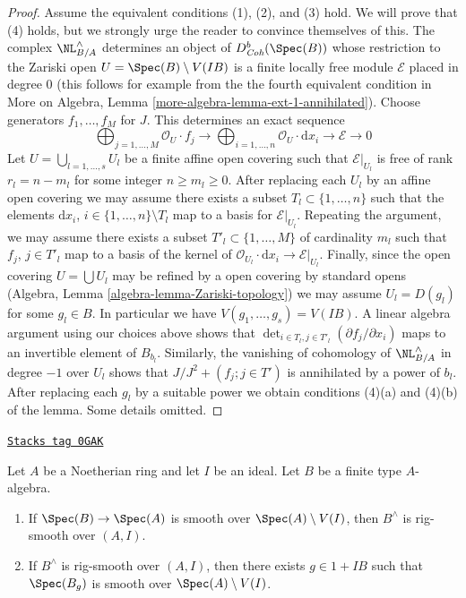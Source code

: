 \begin{proof}
\medskip\noindent
Assume the equivalent conditions (1), (2), and (3) hold. We will prove
that (4) holds, but we strongly urge the reader to convince themselves
of this. The complex $\NL_{B/A}^\wedge$ determines an object of
$D^b_{\textit{Coh}}(\Spec(B))$ whose restriction to the Zariski open
$U = \Spec(B) \setminus V(IB)$ is a finite locally free module
$\mathcal{E}$ placed in degree $0$ (this follows for example from the
the fourth equivalent condition in
More on Algebra, Lemma \ref{more-algebra-lemma-ext-1-annihilated}).
Choose generators $f_1, \ldots, f_M$ for $J$.
This determines an exact sequence
$$
\bigoplus\nolimits_{j = 1, \ldots, M} \mathcal{O}_U \cdot f_j \to
\bigoplus\nolimits_{i = 1, \ldots, n} \mathcal{O}_U \cdot \text{d}x_i \to
\mathcal{E} \to 0
$$
Let $U = \bigcup_{l = 1, \ldots, s} U_l$
be a finite affine open covering such that
$\mathcal{E}|_{U_l}$ is free of rank $r_l = n - m_l$ for some integer
$n \geq m_l \geq 0$. After replacing
each $U_l$ by an affine open covering we may assume there exists
a subset $T_l \subset \{1, \ldots, n\}$ such that the elements
$\text{d}x_i$, $i \in \{1, \ldots, n\} \setminus T_l$ map to a
basis for $\mathcal{E}|_{U_l}$. Repeating the argument, we may
assume there exists a subset $T'_l \subset \{1, \ldots, M\}$
of cardinality $m_l$ such that $f_j$, $j \in T'_l$ map to a basis
of the kernel of $\mathcal{O}_{U_l} \cdot \text{d}x_i \to
\mathcal{E}|_{U_l}$. Finally, since the open covering
$U = \bigcup U_l$ may be refined by a open covering by standard opens
(Algebra, Lemma \ref{algebra-lemma-Zariski-topology})
we may assume $U_l = D(g_l)$ for some $g_l \in B$.
In particular we have $V(g_1, \ldots, g_s) = V(IB)$.
A linear algebra argument using our choices above shows that
$\det_{i \in T_l, j \in T'_l}(\partial f_j/ \partial x_i)$
maps to an invertible element of $B_{b_l}$. Similarly, the vanishing
of cohomology of $\NL_{B/A}^\wedge$ in degree $-1$ over $U_l$ shows that
$J/J^2 + (f_j; j \in T')$ is annihilated by a power of $b_l$.
After replacing each $g_l$ by a suitable power we obtain
conditions (4)(a) and (4)(b) of the lemma. Some details omitted.
\end{proof}

\begin{lemma}
\label{restricted-lemma-rig-smooth}
\href{https://stacks.math.columbia.edu/tag/0GAK}{\texttt{Stacks tag 0GAK}}

Let $A$ be a Noetherian ring and let $I$ be an ideal.
Let $B$ be a finite type $A$-algebra.
\begin{enumerate}
\item If $\Spec(B) \to \Spec(A)$ is smooth over $\Spec(A) \setminus V(I)$,
then $B^\wedge$ is rig-smooth over $(A, I)$.
\item If $B^\wedge$ is rig-smooth over $(A, I)$,
then there exists $g \in 1 + IB$ such that $\Spec(B_g)$ is smooth
over $\Spec(A) \setminus V(I)$.
\end{enumerate}
\end{lemma}

